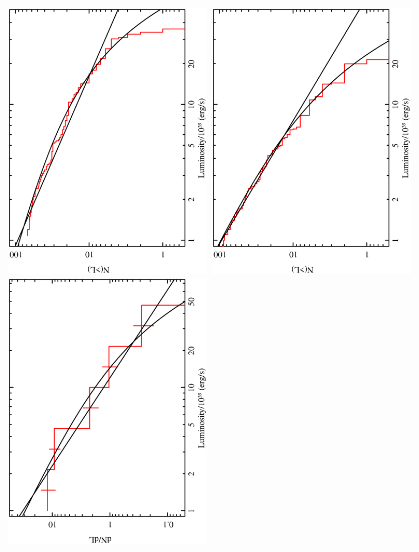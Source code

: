 \documentclass{article}
\begin{document}
\begin{center}
\begin{figure}[t]
\includegraphics[angle=-90,width=0.47\textwidth]{f06a.eps} %
\includegraphics[angle=-90,width=0.47\textwidth]{f06b.eps} %
\vskip 10pt
\includegraphics[angle=-90,width=0.47\textwidth]{f06c.eps} %

\end{figure}
\end{center}
\end{document}
